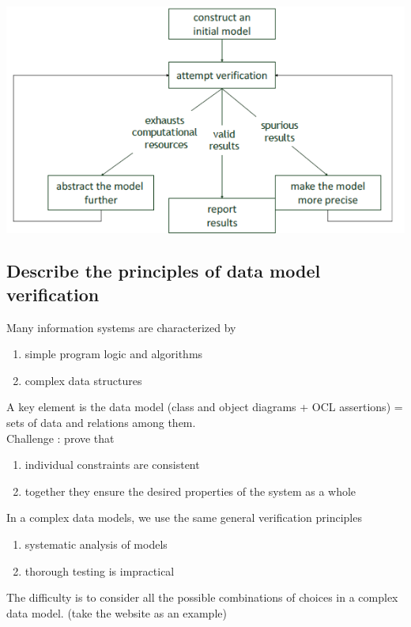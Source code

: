 \documentclass{article}
\begin{document}
\begin{center}
    \includegraphics[scale=0.6]{image/27.PNG}
\end{center}

\newpage
\subsection{Describe the principles of data model verification}
\noindent Many information systems are characterized by 
\begin{enumerate}
    \item simple program logic and algorithms
    \item complex data structures
\end{enumerate}
A key element is the data model (class and object diagrams + OCL assertions) = sets of data and
relations among them.\\

\noindent Challenge : prove that 
\begin{enumerate}
    \item individual constraints are consistent

    \item together they ensure the desired properties of the system as a whole\\
\end{enumerate}

\noindent In a complex data models, we use the same general verification principles
\begin{enumerate}
    \item systematic analysis of models

    \item thorough testing is impractical\\
\end{enumerate}
The difficulty is to consider all the possible combinations of choices in a complex data model. (take the
website as an example)
\end{document}
